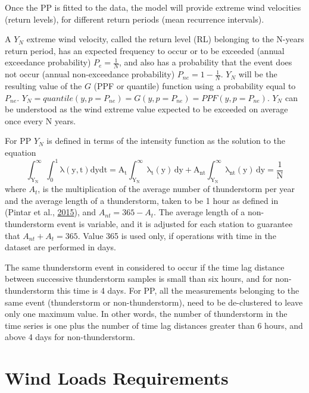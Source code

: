 \documentclass[12pt,twoside]{reedthesis}
\begin{document}
Once the PP is fitted to the data, the model will provide extreme wind velocities (return levels), for different return periods (mean recurrence intervals).

A \(Y_N\) extreme wind velocity, called the return level (RL) belonging to the N-years return period, has an expected frequency to occur or to be exceeded (annual exceedance probability) \(P_e = \frac{1}{N}\), and also has a probability that the event does not occur (annual non-exceedance probability) \(P_{ne}=1-\frac{1}{N}\). \(Y_N\) will be the resulting value of the \(G\) (PPF or quantile) function using a probability equal to \(P_{ne}\). \(Y_N=quantile(y, p=P_{ne})=G(y,p=P_{ne})=PPF(y,p=P_{ne})\). \(Y_N\) can be understood as the wind extreme value expected to be exceeded on average once every N years.

For PP \(Y_N\) is defined in terms of the intensity function as the solution to the equation
\begin{equation}
  \mathrm{
          \int_{Y_N}^{\infty}\int_0^1\lambda\left( y,t\right)dydt = A_t\int_{Y_N}^{\infty}\lambda_t\left( y\right)\,dy + A_{nt}\int_{Y_N}^{\infty}\lambda_{nt}\left( y\right)\,dy = \frac{1}{N}
         }
  \label{eq:pprl}
\end{equation}
where \(A_t\), is the multiplication of the average number of thunderstorm per year and the average length of a thunderstorm, taken to be 1 hour as defined in (Pintar et al., \protect\hyperlink{ref-Pintar2015}{2015}), and \(A_{nt} = 365 - A_t\). The average length of a non-thunderstorm event is variable, and it is adjusted for each station to guarantee that \(A_{nt} + A_t = 365\). Value 365 is used only, if operations with time in the dataset are performed in days.

The same thunderstorm event in considered to occur if the time lag distance between successive thunderstorm samples is small than six hours, and for non-thunderstorm this time is 4 days. For PP, all the measurements belonging to the same event (thunderstorm or non-thunderstorm), need to be de-clustered to leave only one maximum value. In other words, the number of thunderstorm in the time series is one plus the number of time lag distances greater than 6 hours, and above 4 days for non-thunderstorm.

\hypertarget{windloadsrequirements}{%
\section{Wind Loads Requirements}\label{windloadsrequirements}}
\end{document}
